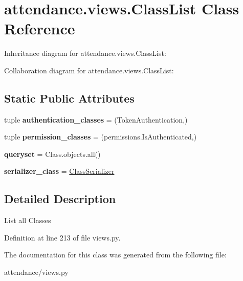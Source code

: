 \hypertarget{classattendance_1_1views_1_1_class_list}{}\section{attendance.\+views.\+Class\+List Class Reference}
\label{classattendance_1_1views_1_1_class_list}


Inheritance diagram for attendance.\+views.\+Class\+List\+:


Collaboration diagram for attendance.\+views.\+Class\+List\+:
\subsection*{Static Public Attributes}
\begin{DoxyCompactItemize}
\item 
\hypertarget{classattendance_1_1views_1_1_class_list_ab600b00880416bc649ccded3ded2f8bd}{}\label{classattendance_1_1views_1_1_class_list_ab600b00880416bc649ccded3ded2f8bd} 
tuple {\bfseries authentication\+\_\+classes} = (Token\+Authentication,)
\item 
\hypertarget{classattendance_1_1views_1_1_class_list_a796bd5eefd1a6b3d425ff5d8c1d55e9c}{}\label{classattendance_1_1views_1_1_class_list_a796bd5eefd1a6b3d425ff5d8c1d55e9c} 
tuple {\bfseries permission\+\_\+classes} = (permissions.\+Is\+Authenticated,)
\item 
\hypertarget{classattendance_1_1views_1_1_class_list_a12c5d9fe789ec6fcbcec3dd47c8199a3}{}\label{classattendance_1_1views_1_1_class_list_a12c5d9fe789ec6fcbcec3dd47c8199a3} 
{\bfseries queryset} = Class.\+objects.\+all()
\item 
\hypertarget{classattendance_1_1views_1_1_class_list_a600dd6df61aca8fb74a11ac00195caa7}{}\label{classattendance_1_1views_1_1_class_list_a600dd6df61aca8fb74a11ac00195caa7} 
{\bfseries serializer\+\_\+class} = \hyperlink{classattendance_1_1serializers_1_1_class_serializer}{Class\+Serializer}
\end{DoxyCompactItemize}


\subsection{Detailed Description}
\begin{DoxyVerb}List all Classes
\end{DoxyVerb}
 

Definition at line 213 of file views.\+py.



The documentation for this class was generated from the following file\+:\begin{DoxyCompactItemize}
\item 
attendance/views.\+py\end{DoxyCompactItemize}
